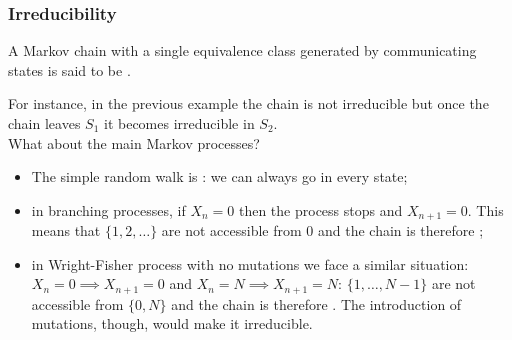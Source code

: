 \documentclass{article}
\begin{document}
\subsubsection{Irreducibility
}
\begin{definition}
    A Markov chain with a single equivalence class generated by communicating states is said to be .
\end{definition}
For instance, in the previous example the chain is not irreducible but once the chain leaves $S_1$ it becomes irreducible in $S_2$.\\
What about the main Markov processes?
\begin{itemize}
    \item The simple random walk is : we can always go in every state;
    \item in branching processes, if $X_n=0$ then the process stops and $X_{n+1}=0$. This means that $\{1,2,\ldots\}$ are not accessible from 0 and the chain is therefore ;
    \item in Wright-Fisher process with no mutations we face a similar situation: $X_n=0\implies X_{n+1}=0 $ and $X_n=N\implies X_{n+1}=N $: $\{1,\ldots,N-1\}$ are not accessible from $\{0,N\}$ and the chain is therefore . The introduction of mutations, though, would make it irreducible.
\end{itemize}
\end{document}
